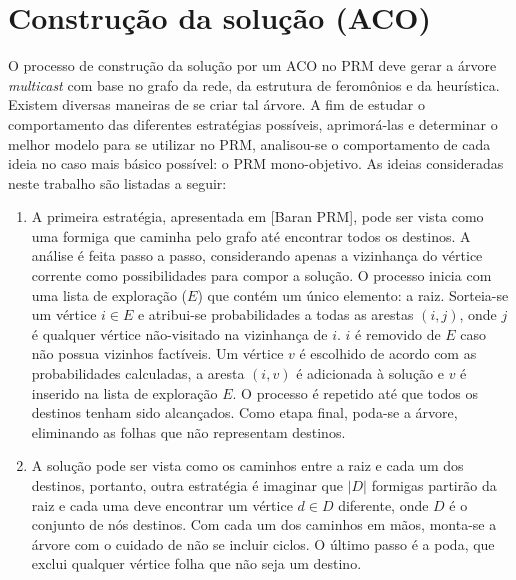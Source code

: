 \section{Construção da solução (ACO)}

O processo de construção da solução por um ACO no PRM deve gerar a árvore \textit{multicast} com base no grafo da rede, da estrutura de feromônios e da heurística. Existem diversas maneiras de se criar tal árvore. A fim de estudar o comportamento das diferentes estratégias possíveis, aprimorá-las e determinar o melhor modelo para se utilizar no PRM, analisou-se o comportamento de cada ideia no caso mais básico possível: o PRM mono-objetivo. As ideias consideradas neste trabalho são listadas a seguir:

\begin{enumerate}
	\item A primeira estratégia, apresentada em [Baran PRM], pode ser vista como uma formiga que caminha pelo grafo até encontrar todos os destinos. A análise é feita passo a passo, considerando apenas a vizinhança do vértice corrente como possibilidades para compor a solução. O processo inicia com uma lista de exploração ($E$) que contém um único elemento: a raiz. Sorteia-se um vértice $i \in E$ e atribui-se probabilidades a todas as arestas $(i, j)$, onde $j$ é qualquer vértice não-visitado na vizinhança de $i$. $i$ é removido de $E$ caso não possua vizinhos factíveis. Um vértice $v$ é escolhido de acordo com as probabilidades calculadas, a aresta $(i, v)$ é adicionada à solução e $v$ é inserido na lista de exploração $E$. O processo é repetido até que todos os destinos tenham sido alcançados. Como etapa final, poda-se a árvore, eliminando as folhas que não representam destinos.
	\item A solução pode ser vista como os caminhos entre a raiz e cada um dos destinos, portanto, outra estratégia é imaginar que $|D|$ formigas partirão da raiz e cada uma deve encontrar um vértice $d \in D$ diferente, onde $D$ é o conjunto de nós destinos. Com cada um dos caminhos em mãos, monta-se a árvore com o cuidado de não se incluir ciclos. O último passo é a poda, que exclui qualquer vértice folha que não seja um destino. %

\end{enumerate}
